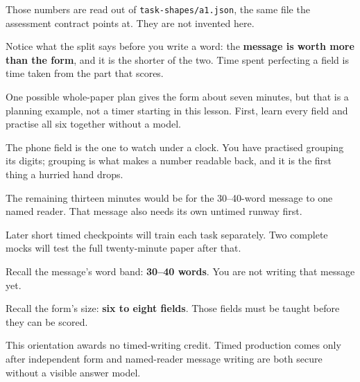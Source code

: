 Those numbers are read out of \texttt{task-shapes/a1.json}, the same file the assessment contract points at. They are not invented here.

Notice what the split says before you write a word: the \textbf{message is worth more than the form}, and it is the shorter of the two. Time spent perfecting a field is time taken from the part that scores.

One possible whole-paper plan gives the form about seven minutes, but that is a planning example, not a timer starting in this lesson. First, learn every field and practise all six together without a model.

The phone field is the one to watch under a clock. You have practised grouping its digits; grouping is what makes a number readable back, and it is the first thing a hurried hand drops.

The remaining thirteen minutes would be for the 30–40-word message to one named reader. That message also needs its own untimed runway first.

Later short timed checkpoints will train each task separately. Two complete mocks will test the full twenty-minute paper after that.

\begin{tcolorbox}[breakable,colback=teal!4,colframe=teal!35!black,title={Before you move on}]
Recall the message's word band: \textbf{30–40 words}. You are not writing that message yet.

Recall the form's size: \textbf{six to eight fields}. Those fields must be taught before they can be scored.

This orientation awards no timed-writing credit. Timed production comes only after independent form and named-reader message writing are both secure without a visible answer model.
\end{tcolorbox}
